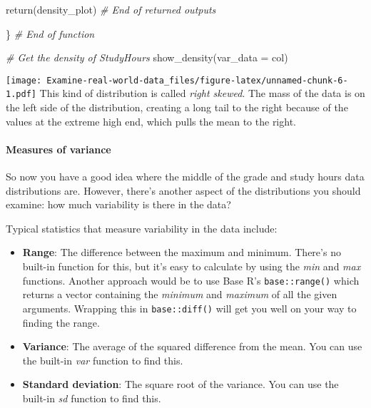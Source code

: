 \documentclass[
]{article}
\newenvironment{Shaded}{\begin{snugshade}}{\end{snugshade}}
\newcommand{\AttributeTok}[1]{\textcolor[rgb]{0.77,0.63,0.00}{#1}}
\newcommand{\CommentTok}[1]{\textcolor[rgb]{0.56,0.35,0.01}{\textit{#1}}}
\newcommand{\FunctionTok}[1]{\textcolor[rgb]{0.00,0.00,0.00}{#1}}
\newcommand{\NormalTok}[1]{#1}
\begin{document}
\begin{Shaded}
\begin{Highlighting}[]
  
  
  \FunctionTok{return}\NormalTok{(density\_plot) }\CommentTok{\# End of returned outputs}
  
\NormalTok{\} }\CommentTok{\# End of function}


\CommentTok{\# Get the density of StudyHours}
\FunctionTok{show\_density}\NormalTok{(}\AttributeTok{var\_data =}\NormalTok{ col)}
\end{Highlighting}
\end{Shaded}

\texttt{[image: Examine-real-world-data\_files/figure-latex/unnamed-chunk-6-1.pdf]}
This kind of distribution is called \emph{right skewed}. The mass of the
data is on the left side of the distribution, creating a long tail to
the right because of the values at the extreme high end, which pulls the
mean to the right.

\hypertarget{measures-of-variance}{%
\paragraph{Measures of variance}\label{measures-of-variance}}

So now you have a good idea where the middle of the grade and study
hours data distributions are. However, there's another aspect of the
distributions you should examine: how much variability is there in the
data?

Typical statistics that measure variability in the data include:

\begin{itemize}
\item
  \textbf{Range}: The difference between the maximum and minimum.
  There's no built-in function for this, but it's easy to calculate by
  using the \emph{min} and \emph{max} functions. Another approach would
  be to use Base R's \texttt{base::range()} which returns a vector
  containing the \emph{minimum} and \emph{maximum} of all the given
  arguments. Wrapping this in \texttt{base::diff()} will get you well on
  your way to finding the range.
\item
  \textbf{Variance}: The average of the squared difference from the
  mean. You can use the built-in \emph{var} function to find this.
\item
  \textbf{Standard deviation}: The square root of the variance. You can
  use the built-in \emph{sd} function to find this.
\end{itemize}
\end{document}
